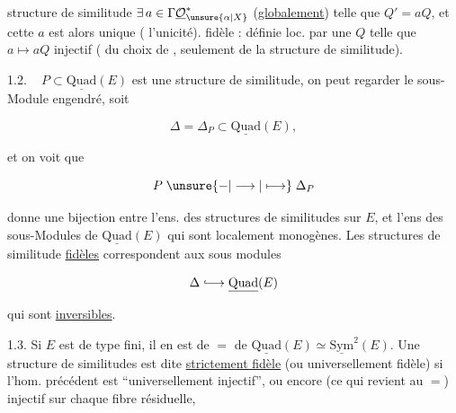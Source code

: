 
structure de similitude  $\exists\,a\in\Gamma\underline{\mathcal O}_{\unsure{\alpha|X}}^\ast$ (\uline{globalement}) telle que $Q'=aQ$, et cette $a$ est alors unique ( l'unicité).   fidèle : définie loc. par une $Q$ telle que $a\longmapsto aQ$ injectif ( du choix de , seulement de la structure de similitude).

1.2. \  $P\subset\underline{\mathrm{Quad}}(E)$ est une structure de similitude, on peut regarder le sous-Module engendré, soit

\[\Delta=\Delta_P\subset\underline{\mathrm{Quad}}(E),\]

et on voit que

\[P\mathrel{\unsure{-|\longrightarrow|\longmapsto}}\Delta_P\]

donne une bijection entre l'ens. des structures de similitudes sur $E$, et l'ens des sous-Modules de $\underline{\mathrm{Quad}}(E)$ qui sont localement monogènes. Les  structures  de similitude \uline{fidèles} correspondent aux sous modules

\[\Delta\lhook\joinrel\longrightarrow\underline{\mathrm{Quad}}(E)\]

qui sont \uline{inversibles}.


1.3. Si $E$ est   de type fini, il en  est de $=$ de $\underline{\mathrm{Quad}}(E)\simeq\underline{\mathrm{Sym}}^2(E)$. Une structure de similitudes est dite \uline{strictement fidèle} (ou universellement fidèle) si l'hom. précédent est ``universellement injectif'', ou encore (ce qui revient au $=$) injectif sur chaque fibre résiduelle,
